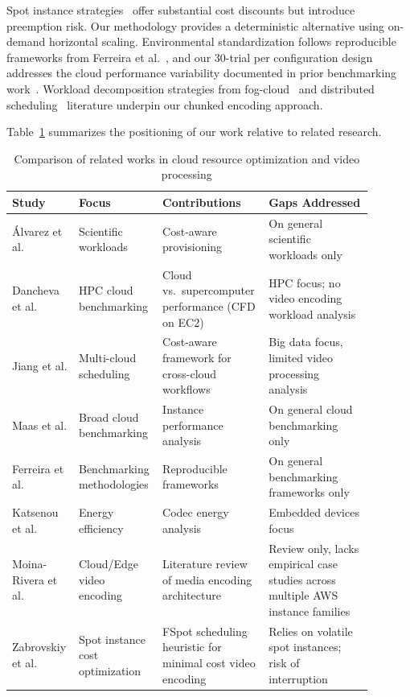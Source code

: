\documentclass[conference]{IEEEtran}
\begin{document}
Spot instance strategies~\cite{b21,b19} offer substantial cost discounts but introduce preemption risk. Our methodology provides a deterministic alternative using on-demand horizontal scaling. Environmental standardization follows reproducible frameworks from Ferreira et al.~\cite{b9}, and our 30-trial per configuration design addresses the cloud performance variability documented in prior benchmarking work~\cite{b18,b10,b11}. Workload decomposition strategies from fog-cloud~\cite{b12} and distributed scheduling~\cite{b13} literature underpin our chunked encoding approach.

Table~\ref{tab:comparative_analysis} summarizes the positioning of our work relative to related research.

\begin{table}[!htbp]
	\centering
	\caption{Comparison of related works in cloud resource optimization and video processing}
	\label{tab:comparative_analysis}
	\begin{tabular}{|p{0.15\linewidth}|p{0.18\linewidth}|p{0.28\linewidth}|p{0.28\linewidth}|}
		\hline
		\textbf{Study} & \textbf{Focus} & \textbf{Contributions} & \textbf{Gaps Addressed} \\
		\hline
		Álvarez et al. \cite{b2} & Scientific workloads & Cost-aware provisioning & On general scientific workloads only \\
		\hline
		Dancheva et al. \cite{b3} & HPC cloud benchmarking & Cloud vs.\ supercomputer performance (CFD on EC2) & HPC focus; no video encoding workload analysis \\
		\hline
		Jiang et al. \cite{b20} & Multi-cloud scheduling & Cost-aware framework for cross-cloud workflows & Big data focus, limited video processing analysis \\
		\hline
		Maas et al. \cite{b1} & Broad cloud benchmarking & Instance performance analysis & On general cloud benchmarking only \\
		\hline
		Ferreira et al. \cite{b9} & Benchmarking methodologies & Reproducible frameworks & On general benchmarking frameworks only \\
		\hline
		Katsenou et al. \cite{b8} & Energy efficiency & Codec energy analysis & Embedded devices focus \\
		\hline
		Moina-Rivera et al. \cite{b22} & Cloud/Edge video encoding & Literature review of media encoding architecture & Review only, lacks empirical case studies across multiple AWS instance families \\
		\hline
		Zabrovskiy et al. \cite{b21} & Spot instance cost optimization & FSpot scheduling heuristic for minimal cost video encoding & Relies on volatile spot instances; risk of interruption \\

\end{tabular}
\end{table}
\end{document}
